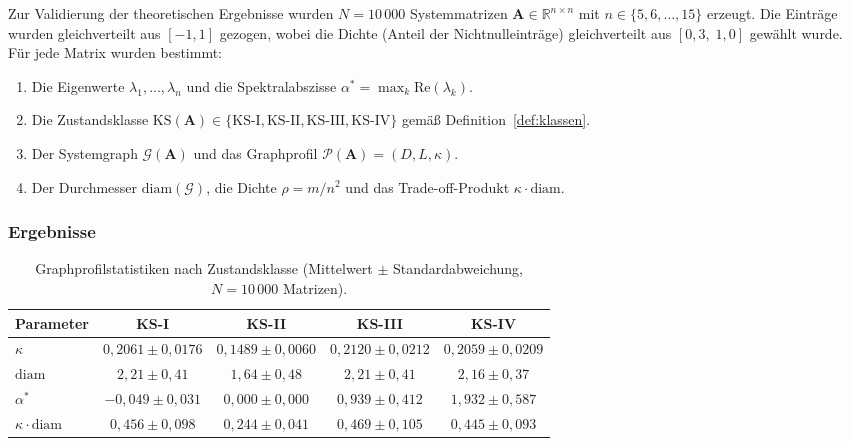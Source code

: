\documentclass[a4paper, 12pt, twoside, openright]{report}
\theoremstyle{definition}
\theoremstyle{definition}
\newcommand{\R}{\mathbb{R}}
\newcommand{\vA}{\bm{A}}
\newcommand{\re}{\mathrm{Re}}
\newcommand{\KS}{\mathrm{KS}}
\begin{document}
Zur Validierung der theoretischen Ergebnisse wurden $N = 10\,000$ Systemmatrizen
$\vA \in \R^{n \times n}$ mit $n \in \{5, 6, \ldots, 15\}$ erzeugt. Die Einträge
wurden gleichverteilt aus $[-1, 1]$ gezogen, wobei die Dichte (Anteil der
Nichtnulleinträge) gleichverteilt aus $[0{,}3,\; 1{,}0]$ gewählt wurde.
Für jede Matrix wurden bestimmt:
\begin{enumerate}[label=(\alph*)]
  \item Die Eigenwerte $\lambda_1, \ldots, \lambda_n$ und die Spektralabszisse
    $\alpha^* = \max_k \re(\lambda_k)$.
  \item Die Zustandsklasse $\KS(\vA) \in \{\text{KS-I}, \text{KS-II}, \text{KS-III},
    \text{KS-IV}\}$ gemäß Definition~\ref{def:klassen}.
  \item Der Systemgraph $\mathcal{G}(\vA)$ und das Graphprofil
    $\mathcal{P}(\vA) = (D, L, \kappa)$.
  \item Der Durchmesser $\mathrm{diam}(\mathcal{G})$, die Dichte
    $\rho = m / n^2$ und das Trade-off-Produkt $\kappa \cdot \mathrm{diam}$.
\end{enumerate}

\subsubsection{Ergebnisse}

\begin{table}[H]
\centering
\caption{Graphprofilstatistiken nach Zustandsklasse (Mittelwert $\pm$ Standardabweichung,
  $N = 10\,000$ Matrizen).}
\label{tab:gpv_statistiken}
\begin{tabular}{lcccc}
\toprule
\textbf{Parameter} & \textbf{KS-I} & \textbf{KS-II} & \textbf{KS-III} & \textbf{KS-IV} \\
\midrule
$\kappa$ & $0{,}2061 \pm 0{,}0176$ & $0{,}1489 \pm 0{,}0060$ & $0{,}2120 \pm 0{,}0212$ & $0{,}2059 \pm 0{,}0209$ \\
$\mathrm{diam}$ & $2{,}21 \pm 0{,}41$ & $1{,}64 \pm 0{,}48$ & $2{,}21 \pm 0{,}41$ & $2{,}16 \pm 0{,}37$ \\
$\alpha^*$ & $-0{,}049 \pm 0{,}031$ & $0{,}000 \pm 0{,}000$ & $0{,}939 \pm 0{,}412$ & $1{,}932 \pm 0{,}587$ \\
$\kappa \cdot \mathrm{diam}$ & $0{,}456 \pm 0{,}098$ & $0{,}244 \pm 0{,}041$ & $0{,}469 \pm 0{,}105$ & $0{,}445 \pm 0{,}093$ \\
\bottomrule
\end{tabular}
\end{table}
\end{document}
